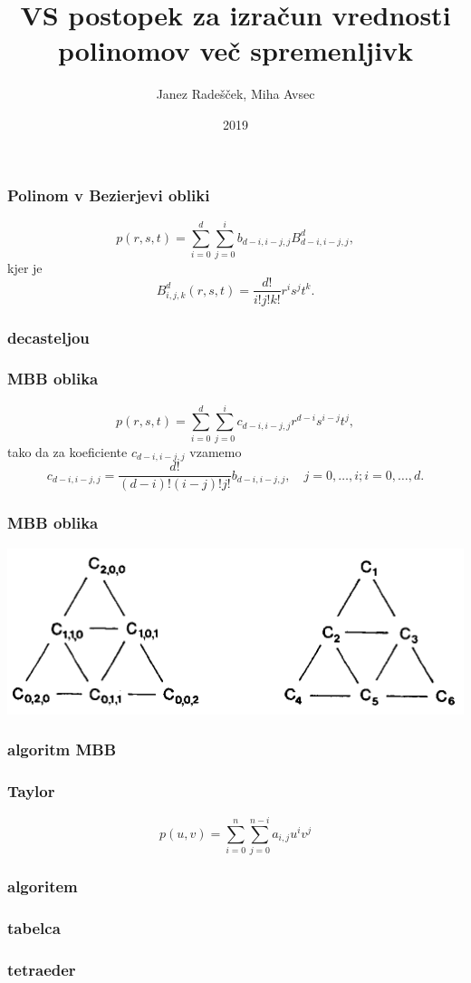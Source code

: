 \documentclass{beamer}
\title{VS postopek za izračun vrednosti polinomov več spremenljivk}
\author{Janez Radešček, Miha Avsec}
\institute{Fakulteta za matematiko in fiziko}
\date{2019}
\begin{document}
 
\frame{\titlepage}

\begin{frame}
\frametitle{Polinom v Bezierjevi obliki}

$$p(r,s,t) = \sum_{i=0}^{d}\sum_{j=0}^{i}b_{d-i,i-j,j}B_{d-i,i-j,j}^{d},$$
kjer je
$$B_{i,j,k}^{d}(r,s,t) = \frac{d!}{i!j!k!}r^is^jt^k.$$

\end{frame}

\begin{frame}
\frametitle{decasteljou}



\end{frame}



\begin{frame}
\frametitle{MBB oblika}

$$p(r,s,t) = \sum_{i=0}^{d}\sum_{j=0}^{i}c_{d-i,i-j,j}r^{d-i}s^{i-j}t^j,$$
tako da za koeficiente $c_{d-i,i-j,j}$ vzamemo
$$c_{d-i,i-j,j} = \frac{d!}{(d-i)!(i-j)!j!}b_{d-i,i-j,j}, \quad j=0,\ldots, i; i = 0,\ldots,d.$$
\end{frame}


\begin{frame}
\frametitle{MBB oblika}
\begin{center}
\includegraphics[width=.9\linewidth]{graf.png}
\end{center}

\end{frame}

\begin{frame}
\frametitle{algoritm MBB}
\end{frame}

\begin{frame}
\frametitle{Taylor}
$$p(u,v) = \sum_{i = 0}^n{\sum_{j=0}^{n-i}{a_{i,j}u^iv^j }}$$
\end{frame}



\begin{frame}
\frametitle{algoritem}
\end{frame}

\begin{frame}
\frametitle{tabelca}
\end{frame}


\begin{frame}
\frametitle{tetraeder}
\end{frame}
\end{document}
